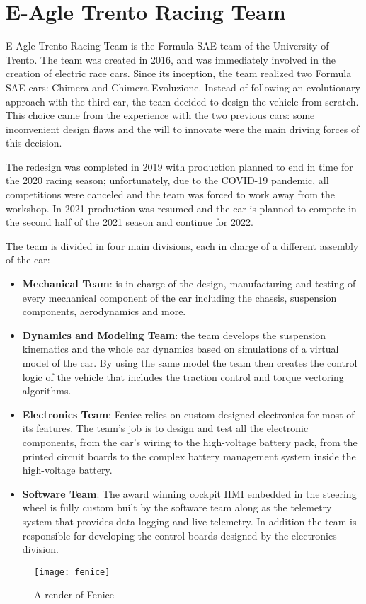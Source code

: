 \section{E-Agle Trento Racing Team}
E-Agle Trento Racing Team is the Formula SAE team of the University of Trento. The team was created in 2016, and was immediately involved in the creation of electric race cars. Since its inception, the team realized two Formula SAE cars: Chimera and Chimera Evoluzione. Instead of following an evolutionary approach with the third car, the team decided to design the vehicle from scratch. This choice came from the experience with the two previous cars: some inconvenient design flaws and the will to innovate were the main driving forces of this decision.

The redesign was completed in 2019 with production planned to end in time for the 2020 racing season; unfortunately, due to the COVID-19 pandemic, all competitions were canceled and the team was forced to work away from the workshop. In 2021 production was resumed and the car is planned to compete in the second half of the 2021 season and continue for 2022.

The team is divided in four main divisions, each in charge of a different assembly of the car:
\begin{itemize}
    \item \textbf{Mechanical Team}: is in charge of the design, manufacturing and testing of every mechanical component of the car including the chassis, suspension components, aerodynamics and more.
    \item \textbf{Dynamics and Modeling Team}: the team develops the suspension kinematics and the whole car dynamics based on simulations of a virtual model of the car. By using the same model the team then creates the control logic of the vehicle that includes the traction control and torque vectoring algorithms.
    \item \textbf{Electronics Team}: Fenice relies on custom-designed electronics for most of its features. The team's job is to design and test all the electronic components, from the car's wiring to the high-voltage battery pack, from the printed circuit boards to the complex battery management system inside the high-voltage battery.
    \item \textbf{Software Team}: The award winning cockpit HMI embedded in the steering wheel is fully custom built by the software team along as the telemetry system that provides data logging and live telemetry. In addition the team is responsible for developing the control boards designed by the electronics division.
\end{itemize}

\begin{figure*}[h]
    \centering
    \texttt{[image: fenice]}
    \caption{A render of Fenice}
    \label{fig:fenice_render}
\end{figure*}

\newpage

